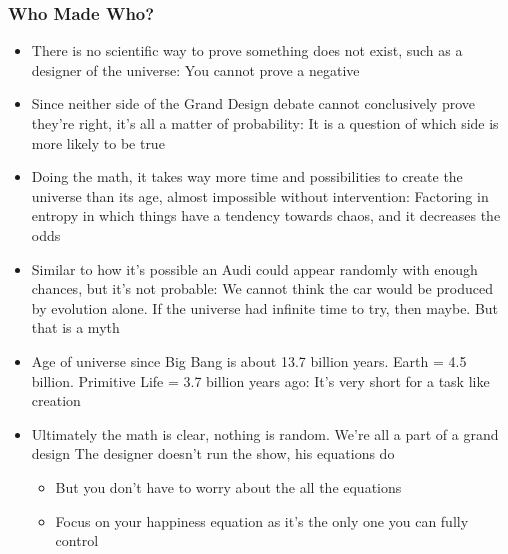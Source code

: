 \begin{frame}[fragile]\frametitle{Who Made Who?}

\begin{itemize}
\item There is no scientific way to prove something does not exist, such as a designer of the universe: You cannot prove a negative
\item Since neither side of the Grand Design debate cannot conclusively prove they’re right, it’s all a matter of probability: It is a question of which side is more likely to be true
\item Doing the math, it takes way more time and possibilities to create the universe than its age, almost impossible without intervention: Factoring in entropy in which things have a tendency towards chaos, and it decreases the odds
\item Similar to how it’s possible an Audi could appear randomly with enough chances, but it’s not probable: We cannot think the car would be produced by evolution alone. If the universe had infinite time to try, then maybe. But that is a myth
\item Age of universe since Big Bang is about 13.7 billion years. Earth = 4.5 billion. Primitive Life = 3.7 billion years ago: It’s very short for a task like creation
\item Ultimately the math is clear, nothing is random. We’re all a part of a grand design
The designer doesn’t run the show, his equations do
	\begin{itemize}
	\item But you don’t have to worry about the all the equations
	\item Focus on your happiness equation as it’s the only one you can fully control
	\end{itemize}

\end{itemize}

\end{frame}

